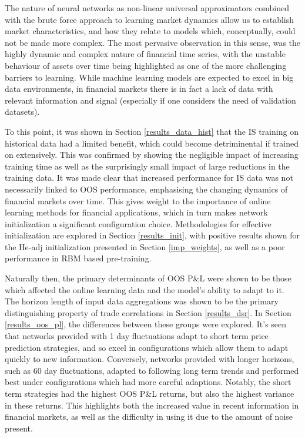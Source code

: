\documentclass[a4paper,11pt,oneside]{article}
\theoremstyle{plain}
\theoremstyle{definition}
\begin{document}
	The nature of neural networks as non-linear universal approximators combined with the brute force approach to learning market dynamics allow us to establish market characteristics, and how they relate to models which, conceptually, could not be made more complex. The most pervasive observation in this sense, was the highly dynamic and complex nature of financial time series, with the unstable behaviour of assets over time being highlighted as one of the more challenging barriers to learning. While machine learning models are expected to excel in big data environments, in financial markets there is in fact a lack of data with relevant information and signal (especially if one considers the need of validation datasets). \newline
	
	To this point, it was shown in Section \ref{results_data_hist} that the IS training on historical data had a limited benefit, which could become detriminental if trained on extensively. This was confirmed by showing the negligible impact of increasing training time as well as the surprisingly small impact of large reductions in the training data. It was made clear that increased performance for IS data was not necessarily linked to OOS performance, emphasising the changing dynamics of financial markets over time. This gives weight to the importance of online learning methods for financial applications, which in turn makes network initialization a significant configuration choice. Methodologies for effective initialization are explored in Section \ref{results_init}, with positive results shown for the He-adj initialization presented in Section \ref{imp_weights}, as well as a poor performance in RBM based pre-training.  \newline
	
	Naturally then, the primary determinants of OOS P\&L were shown to be those which affected the online learning data and the model's ability to adapt to it. The horizon length of input data aggregations was shown to be the primary distinguishing property of trade correlations in Section \ref{results_dsr}. In Section \ref{results_oos_pl}, the differences between these groups were explored. It's seen that networks provided with 1 day fluctuations adapt to short term price prediction strategies, and so excel in configurations which allow them to adapt quickly to new information. Conversely, networks provided with longer horizons, such as 60 day fluctuations, adapted to following long term trends and performed best under configurations which had more careful adaptions. Notably, the short term strategies had the highest OOS P\&L returns, but also the highest variance in these returns. This highlights both the increased value in recent information in financial markets, as well as the difficulty in using it due to the amount of noise present.\newline 
	
\end{document}
